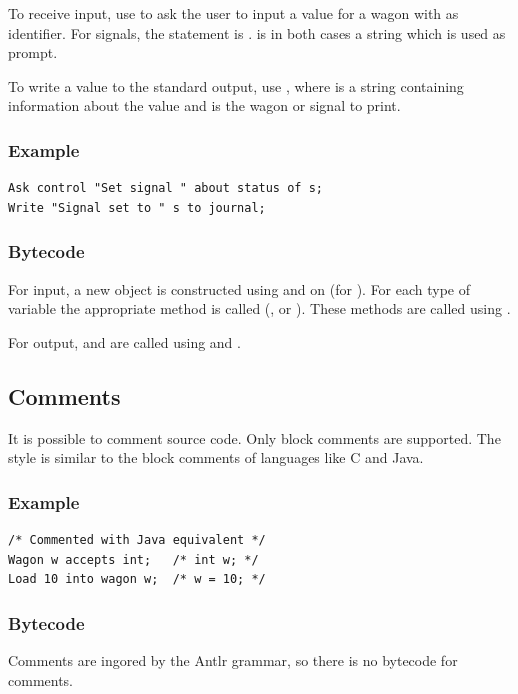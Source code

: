 To receive input, use  to ask the user to input a value for a wagon with  as identifier. For signals, the statement is .  is in both cases a string which is used as prompt.

To write a value to the standard output, use , where  is a string containing information about the value and  is the wagon or signal to print.

\subsubsection*{Example}

\begin{lstlisting}
Ask control "Set signal " about status of s;
Write "Signal set to " s to journal;
\end{lstlisting}

\subsubsection*{Bytecode}

For input, a new  object is constructed using  and  on  (for ). For each type of variable the appropriate method is called (,  or ). These methods are called using .

For output,  and  are called using  and .

\subsection{Comments}

It is possible to comment source code. Only block comments are supported. The style is similar to the block comments of languages like C and Java.

\subsubsection*{Example}

\begin{lstlisting}
/* Commented with Java equivalent */
Wagon w accepts int;   /* int w; */
Load 10 into wagon w;  /* w = 10; */
\end{lstlisting}

\subsubsection*{Bytecode}

Comments are ingored by the Antlr grammar, so there is no bytecode for comments.
